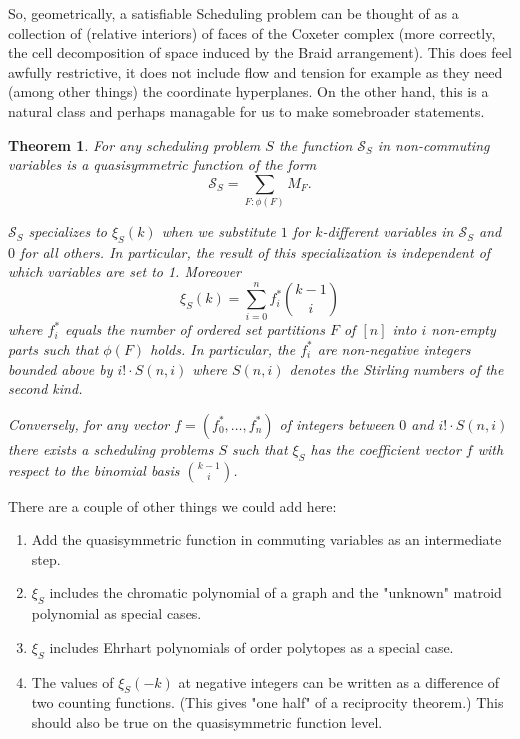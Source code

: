 \documentclass[12pt]{amsart}
\newtheorem{theorem}[definition]{Theorem}
\newcommand{\SSS}{\mathcal{S}}
\begin{document}
So, geometrically, a satisfiable Scheduling problem can be thought of
as a collection of (relative interiors) of faces of the Coxeter
complex (more correctly, the cell decomposition of space induced by
the Braid arrangement).  This does feel awfully restrictive, it does
not include flow and tension for example as they need (among other
things) the coordinate hyperplanes.  On the other hand, this is a
natural class and perhaps managable for us to make somebroader
statements.



\begin{theorem}
For any scheduling problem $S$ the function $\SSS_S$ in non-commuting variables is a quasisymmetric function of the form
\[
  \SSS_S = \sum_{F: \phi(F)} M_F.
\]

$\SSS_S$ specializes to $\xi_S(k)$ when we substitute $1$ for $k$-different variables in $\SSS_S$ and $0$ for all others. In particular, the result of this specialization is independent of which variables are set to 1. Moreover
\[
  \xi_S(k) = \sum_{i=0}^n f_i^* \binom{k-1}{i}
\]
where $f_i^*$ equals the number of ordered set partitions $F$ of $[n]$ into $i$ non-empty parts such that $\phi(F)$ holds. In particular, the $f_i^*$ are non-negative integers bounded above by $i!\cdot S(n,i)$ where $S(n,i)$ denotes the Stirling numbers of the second kind.

Conversely, for any vector $f=(f_0^*,\ldots,f_n^*)$ of integers between $0$ and $i!\cdot S(n,i)$ there exists a scheduling problems $S$ such that $\xi_S$ has the coefficient vector $f$ with respect to the binomial basis $\binom{k-1}{i}$.
\end{theorem}

There are a couple of other things we could add here:
\begin{enumerate}
\item Add the quasisymmetric function in commuting variables as an intermediate step.
\item $\xi_S$ includes the chromatic polynomial of a graph and the "unknown" matroid polynomial as special cases.
\item $\xi_S$ includes Ehrhart polynomials of order polytopes as a special case.
\item The values of $\xi_S(-k)$ at negative integers can be written as a difference of two counting functions. (This gives "one half" of a reciprocity theorem.) This should also be true on the quasisymmetric function level.
\end{enumerate}
\end{document}
